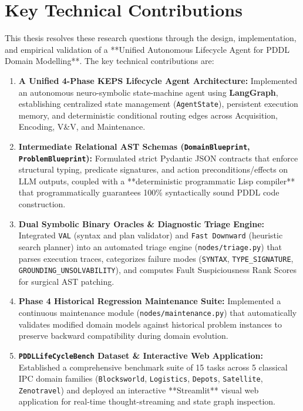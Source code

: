 \documentclass[11pt,a4paper]{report}
\begin{document}
\section{Key Technical Contributions}
This thesis resolves these research questions through the design, implementation, and empirical validation of a **Unified Autonomous Lifecycle Agent for PDDL Domain Modelling**. The key technical contributions are:
\begin{enumerate}
    \item \textbf{A Unified 4-Phase KEPS Lifecycle Agent Architecture:} Implemented an autonomous neuro-symbolic state-machine agent using \textbf{LangGraph}, establishing centralized state management (\texttt{AgentState}), persistent execution memory, and deterministic conditional routing edges across Acquisition, Encoding, V\&V, and Maintenance.
    \item \textbf{Intermediate Relational AST Schemas (\texttt{DomainBlueprint}, \texttt{ProblemBlueprint}):} Formulated strict Pydantic JSON contracts that enforce structural typing, predicate signatures, and action preconditions/effects on LLM outputs, coupled with a **deterministic programmatic Lisp compiler** that programmatically guarantees 100\% syntactically sound PDDL code construction.
    \item \textbf{Dual Symbolic Binary Oracles \& Diagnostic Triage Engine:} Integrated \texttt{VAL} (syntax and plan validator) and \texttt{Fast Downward} (heuristic search planner) into an automated triage engine (\texttt{nodes/triage.py}) that parses execution traces, categorizes failure modes (\texttt{SYNTAX}, \texttt{TYPE\_SIGNATURE}, \texttt{GROUNDING\_UNSOLVABILITY}), and computes Fault Suspiciousness Rank Scores for surgical AST patching.
    \item \textbf{Phase 4 Historical Regression Maintenance Suite:} Implemented a continuous maintenance module (\texttt{nodes/maintenance.py}) that automatically validates modified domain models against historical problem instances to preserve backward compatibility during domain evolution.
    \item \textbf{\texttt{PDDLLifeCycleBench} Dataset \& Interactive Web Application:} Established a comprehensive benchmark suite of 15 tasks across 5 classical IPC domain families (\texttt{Blocksworld}, \texttt{Logistics}, \texttt{Depots}, \texttt{Satellite}, \texttt{Zenotravel}) and deployed an interactive **Streamlit** visual web application for real-time thought-streaming and state graph inspection.
\end{enumerate}
\end{document}
